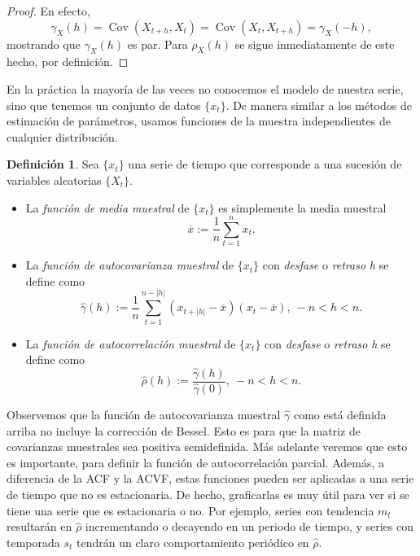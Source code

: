 \documentclass[11pt,letterpaper]{article}
\newcommand{\covariance}{\ensuremath{\operatorname{Cov}}}
\theoremstyle{definition}
\newtheorem{definition}{Definición}[section]
\theoremstyle{theorem}
\theoremstyle{remark}
\begin{document}
	\begin{proof}
		En efecto,
		\[\gamma_X(h)=\covariance(X_{t+h},X_t)=\covariance(X_t,X_{t+h})=\gamma_X(-h),\]
		mostrando que \(\gamma_X(h)\) es par. Para \(\rho_X(h)\) se sigue inmediatamente de este hecho, por definición.
	\end{proof}
	En la práctica la mayoría de las veces no conocemos el modelo de nuestra serie, sino que tenemos un conjunto de datos \(\{x_t\}\). De manera similar a los métodos de estimación de parámetros, usamos funciones de la muestra independientes de cualquier distribución.
	\begin{definition}
		Sea \(\{x_t\}\) una serie de tiempo que corresponde a una sucesión de variables aleatorias \(\{X_t\}\).
		\begin{itemize}
			\item La \textit{función de media muestral} de \(\{x_t\}\) es simplemente la media muestral \[\overline{x}:=\frac{1}{n}\sum_{t=1}^{n}x_t.\]
			\item La \textit{función de autocovarianza muestral} de \(\{x_t\}\) con \textit{desfase} o \textit{retraso} \textit{h} se define como \[\hat{\gamma}(h):=\frac{1}{n}\sum_{t=1}^{n-|h|}(x_{t+|h|}-\overline{x})(x_t- \overline{x}),\ -n<h<n.\]
			\item La \textit{función de autocorrelación muestral} de \(\{x_t\}\) con \textit{desfase} o \textit{retraso} \textit{h} se define como \[\hat{\rho}(h):=\frac{\hat{\gamma}(h)}{\hat{\gamma}(0)},\ -n<h<n.\]
		\end{itemize}
		Observemos que la función de autocovarianza muestral \(\hat{\gamma}\) como está definida arriba no incluye la corrección de Bessel. Esto es para que la matriz de covarianzas muestrales sea positiva semidefinida. Más adelante veremos que esto es importante, para definir la función de autocorrelación parcial. Además, a diferencia de la ACF y la ACVF, estas funciones pueden ser aplicadas a una serie de tiempo que no es estacionaria. De hecho, graficarlas es muy útil para ver si se tiene una serie que es estacionaria o no. Por ejemplo, series con tendencia \(m_t\) resultarán en \(\hat{\rho}\) incrementando o decayendo en un periodo de tiempo, y series con temporada \(s_t\) tendrán un claro comportamiento periódico en \(\hat{\rho}\).
	\end{definition}
\end{document}
